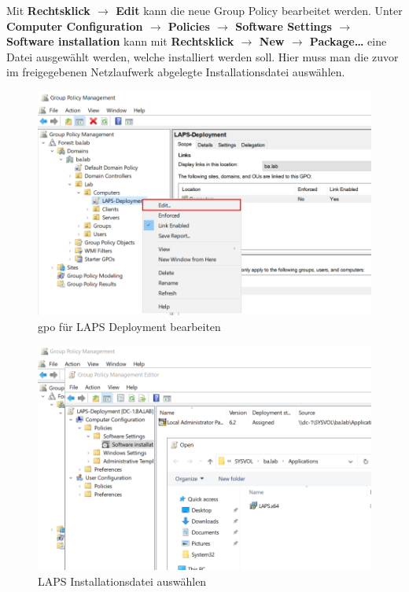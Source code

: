Mit \textbf{Rechtsklick $\rightarrow$ Edit} kann die neue Group Policy bearbeitet werden.
Unter \textbf{Computer Configuration $\rightarrow$ Policies $\rightarrow$ Software Settings $\rightarrow$ Software installation} kann mit \textbf{Rechtsklick $\rightarrow$ New $\rightarrow$ Package\dots} eine Datei ausgewählt werden, welche installiert werden soll.
Hier muss man die zuvor im freigegebenen Netzlaufwerk abgelegte Installationsdatei auswählen.\\
\begin{minipage}{0.5\linewidth}
    \begin{figure}[H]
        \centering
        \includegraphics[width=\linewidth]{../img/LAPS/GPO-Edit-Deployment.png}
        \caption{\acrshort{gpo} für LAPS Deployment bearbeiten}
    \end{figure}
\end{minipage}
\begin{minipage}{0.5\linewidth}
    \begin{figure}[H]
        \centering
        \includegraphics[width=\linewidth]{../img/LAPS/GPO-Edit-Deployment-2.png}
        \caption{LAPS Installationsdatei auswählen}
    \end{figure}
\end{minipage}\\

